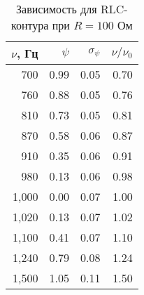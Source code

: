 \begin{table}
\caption{Зависимость для RLC-контура при $R = 100$ Ом}
 \label{RLCtable2}
 \begin{center}
\begin{tabular}{|*{4}{r|}}
\hline 
$\nu$, Гц & $\psi$ & $\sigma_\psi$ & $\nu / \nu_0$ \\ \hline  
700 & 0.99 & 0.05 & 0.70 \\ \hline 
 760 & 0.88 & 0.05 & 0.76 \\ \hline 
 810 & 0.73 & 0.05 & 0.81 \\ \hline 
 870 & 0.58 & 0.06 & 0.87 \\ \hline 
 910 & 0.35 & 0.06 & 0.91 \\ \hline 
 980 & 0.13 & 0.06 & 0.98 \\ \hline 
 1,000 & 0.00 & 0.07 & 1.00 \\ \hline 
 1,020 & 0.13 & 0.07 & 1.02 \\ \hline 
 1,100 & 0.41 & 0.07 & 1.10 \\ \hline 
 1,240 & 0.79 & 0.08 & 1.24 \\ \hline 
 1,500 & 1.05 & 0.11 & 1.50 \\ \hline 
 \end{tabular} 
 \end{center}
\end{table}